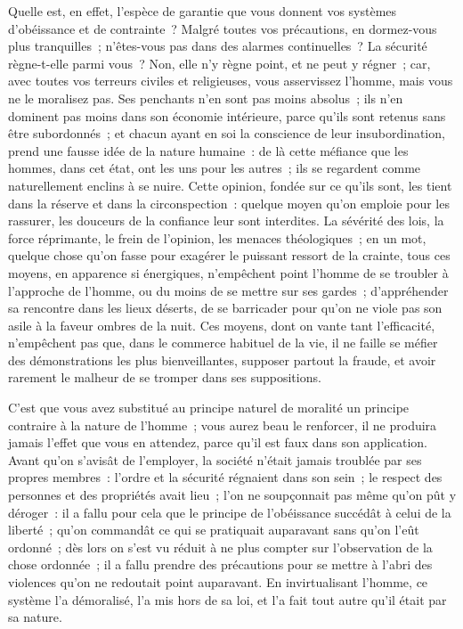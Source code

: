 \documentclass[french,twoside]{book} %
\begin{document}
Quelle est, en effet, l’espèce de garantie que vous donnent vos systèmes d’obéissance et de contrainte ? Malgré toutes vos précautions, en dormez-vous plus tranquilles ; n’êtes-vous pas dans des alarmes continuelles ? La sécurité règne-t-elle parmi vous ? Non, elle n’y règne point, et ne peut y régner ; car, avec toutes vos terreurs civiles et religieuses, vous asservissez l’homme, mais vous ne le moralisez pas. Ses penchants n’en sont pas moins absolus ; ils n’en dominent pas moins dans son économie intérieure, parce qu’ils sont retenus sans être subordonnés ; et chacun ayant en soi la conscience de leur insubordination, prend une fausse idée de la nature humaine : de là cette méfiance que les hommes, dans cet état, ont les uns pour les autres ; ils se regardent comme naturellement enclins à se nuire. Cette opinion, fondée sur ce qu’ils sont, les tient dans la réserve et dans la circonspection : quelque moyen qu’on emploie pour les rassurer, les douceurs de la confiance leur sont interdites. La sévérité des lois, la force réprimante, le frein de l’opinion, les menaces théologiques ; en un mot, quelque chose qu’on fasse pour exagérer le puissant ressort de la crainte, tous ces moyens, en apparence si énergiques, n’empêchent point l’homme de se troubler à l’approche de l’homme, ou du moins de se mettre sur ses gardes ; d’appréhender sa rencontre dans les lieux déserts, de se barricader pour qu’on ne viole pas son asile à la faveur ombres de la nuit. Ces moyens, dont on vante tant l’efficacité, n’empêchent pas que, dans le commerce habituel de la vie, il ne faille se méfier des démonstrations les plus bienveillantes, supposer partout la fraude, et avoir rarement le malheur de se tromper dans ses suppositions.\par
C’est que vous avez substitué au principe naturel de moralité un principe contraire à la nature de l’homme ; vous aurez beau le renforcer, il ne produira jamais l’effet que vous en attendez, parce qu’il est faux dans son application. Avant qu’on s’avisât de l’employer, la société n’était jamais troublée par ses propres membres : l’ordre et la sécurité régnaient dans son sein ; le respect des personnes et des propriétés avait lieu ; l’on ne soupçonnait pas même qu’on pût y déroger : il a fallu pour cela que le principe de l’obéissance succédât à celui de la liberté ; qu’on commandât ce qui se pratiquait auparavant sans qu’on l’eût ordonné ; dès lors on s’est vu réduit à ne plus compter sur l’observation de la chose ordonnée ; il a fallu prendre des précautions pour se mettre à l’abri des violences qu’on ne redoutait point auparavant. En invirtualisant l’homme, ce système l’a démoralisé, l’a mis hors de sa loi, et l’a fait tout autre qu’il était par sa nature.\par
\end{document}
